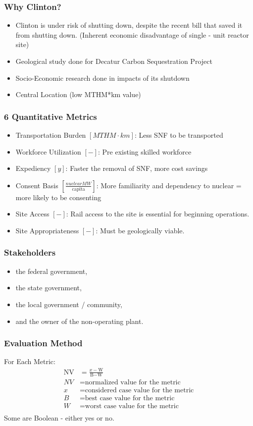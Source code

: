 \begin{frame}
	\frametitle{Why Clinton?}
	\begin{itemize}
		\item Clinton is under risk of shutting down, despite the recent bill that saved
		it from shutting down. (Inherent economic disadvantage of single - unit reactor site)
		\item Geological study done for Decatur Carbon Sequestration Project
		\item Socio-Economic research done in impacts of its shutdown
		\item Central Location (low MTHM*km value)
	\end{itemize}
\end{frame}

\begin{frame}
	\frametitle{6 Quantitative Metrics}
	\begin{itemize}
			\item Transportation Burden $[MTHM \cdot km]$: Less SNF to be transported
			\item Workforce Utilization $[-]$: Pre existing skilled workforce
			\item Expediency $[y]$: Faster the removal of SNF, more cost savings
			\item Consent Basis $[\frac{nuclear MW}{\mbox{capita}}]$: More familiarity
			and dependency to nuclear = more likely to be consenting
			\item Site Access $[-]$: Rail access to the site is essential for 
			beginning operations.
			\item Site Appropriateness $[-]$: Must be geologically viable.
	\end{itemize}

\end{frame}

\begin{frame}
	\frametitle{Stakeholders}
	\begin{itemize}
		\item the federal government,
		\item the state government,
		\item the local government / community,
		\item and the owner of the non-operating plant.
	\end{itemize}
\end{frame}


\begin{frame}
	\frametitle{Evaluation Method}
	For Each Metric:
	\begin{align} 
		\mbox{NV} &= \frac{x-\mbox{W}}{\mbox{B}-\mbox{W}}\\
		NV &= \mbox{normalized value for the metric}\\
		x &= \mbox{considered case value for the metric}\\
		B &= \mbox{best case value for the metric}\\
		W &= \mbox{worst case value for the metric}\\
	\end{align}
	Some are Boolean - either yes or no.
\end{frame}

